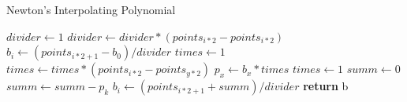 \documentclass{article}
\begin{document}
  \begin{algorithm}
    \caption{Newton's Interpolating Polynomial}
    \begin{algorithmic}[1]
          \State $divider \gets 1$
            \State $divider \gets divider * (points_{i * 2} - points_{i * 2})$
          \EndFor
            \State $b_{i} \gets (points_{i * 2 + 1} - b_{0}) / divider$
          \Else
            \State $times \gets 1$
                \State $times \gets times * (points_{i * 2} - points_{y * 2})$
              \EndFor
              \State $p_{x} \gets b_{x} * times$
              \State $times \gets 1$
            \EndFor
            \State $summ \gets 0$
              \State $summ \gets summ - p_{k}$
            \EndFor
            \State $b_{i} \gets (points_{i * 2 + 1} + summ) / divider$
          \EndIf
        \EndFor
        \State \textbf{return} b
      \EndProcedure
    \end{algorithmic}
  \end{algorithm}
\end{document}
